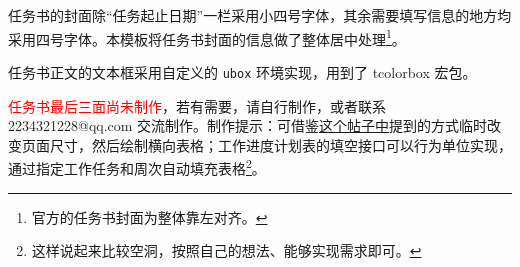 任务书的封面除“任务起止日期”一栏采用小四号字体，其余需要填写信息的地方均采用四号字体。本模板将任务书封面的信息做了整体居中处理\footnote{官方的任务书封面为整体靠左对齐。}。

任务书正文的文本框采用自定义的 \verb!ubox! 环境实现，用到了 tcolorbox 宏包。

\textcolor{red}{任务书最后三面尚未制作}，若有需要，请自行制作，或者联系 2234321228@qq.com 交流制作。制作提示：可借鉴\href{https://stackoverflow.com/questions/2812892/change-paper-size-in-the-middle-of-a-latex-document}{这个帖子中}提到的方式临时改变页面尺寸，然后绘制横向表格；工作进度计划表的填空接口可以行为单位实现，通过指定工作任务和周次自动填充表格\footnote{这样说起来比较空洞，按照自己的想法、能够实现需求即可。}。

